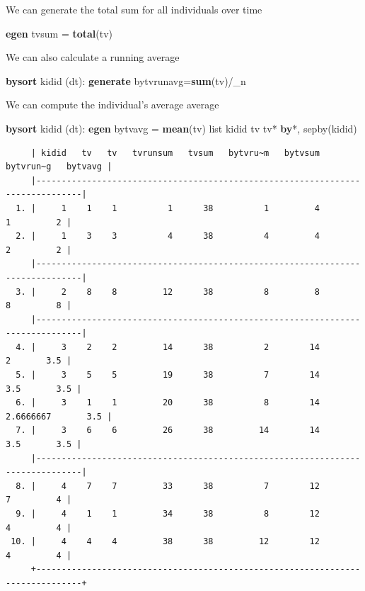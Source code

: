 \documentclass[
]{book}
\newenvironment{Shaded}{\begin{snugshade}}{\end{snugshade}}
\newcommand{\DataTypeTok}[1]{\textcolor[rgb]{0.13,0.29,0.53}{#1}}
\newcommand{\KeywordTok}[1]{\textcolor[rgb]{0.13,0.29,0.53}{\textbf{#1}}}
\newcommand{\NormalTok}[1]{#1}
\newcommand{\OtherTok}[1]{\textcolor[rgb]{0.56,0.35,0.01}{#1}}
\begin{document}
We can generate the total sum for all individuals over time

\begin{Shaded}
\begin{Highlighting}[]
\KeywordTok{egen}\NormalTok{ tvsum = }\KeywordTok{total}\NormalTok{(tv)}
\end{Highlighting}
\end{Shaded}

We can also calculate a running average

\begin{Shaded}
\begin{Highlighting}[]
\KeywordTok{bysort}\NormalTok{ kidid (dt): }\KeywordTok{generate}\NormalTok{ bytvrunavg=}\KeywordTok{sum}\NormalTok{(tv)/}\DataTypeTok{\_n}
\end{Highlighting}
\end{Shaded}

We can compute the individual's average average

\begin{Shaded}
\begin{Highlighting}[]
\KeywordTok{bysort}\NormalTok{ kidid (dt): }\KeywordTok{egen}\NormalTok{ bytvavg = }\KeywordTok{mean}\NormalTok{(tv)}
\OtherTok{list}\NormalTok{ kidid tv tv* }\KeywordTok{by}\NormalTok{*, sepby(kidid)}
\end{Highlighting}
\end{Shaded}

\begin{verbatim}
     | kidid   tv   tv   tvrunsum   tvsum   bytvru~m   bytvsum   bytvrun~g   bytvavg |
     |-------------------------------------------------------------------------------|
  1. |     1    1    1          1      38          1         4           1         2 |
  2. |     1    3    3          4      38          4         4           2         2 |
     |-------------------------------------------------------------------------------|
  3. |     2    8    8         12      38          8         8           8         8 |
     |-------------------------------------------------------------------------------|
  4. |     3    2    2         14      38          2        14           2       3.5 |
  5. |     3    5    5         19      38          7        14         3.5       3.5 |
  6. |     3    1    1         20      38          8        14   2.6666667       3.5 |
  7. |     3    6    6         26      38         14        14         3.5       3.5 |
     |-------------------------------------------------------------------------------|
  8. |     4    7    7         33      38          7        12           7         4 |
  9. |     4    1    1         34      38          8        12           4         4 |
 10. |     4    4    4         38      38         12        12           4         4 |
     +-------------------------------------------------------------------------------+
\end{verbatim}
\end{document}
